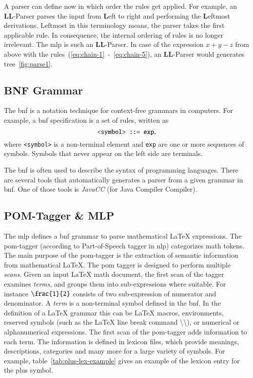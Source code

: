 A parser can define now in which order the rules get applied. For example, an \textbf{LL}-Parser parses the input from \textbf{L}eft to right and performing the \textbf{L}eftmost derivations. Leftmost in this terminology means, the parser takes the first applicable rule. In consequence, the internal ordering of rules is no longer irrelevant. The \gls{mlp} is such an \textbf{LL}-Parser. In case of the expression $x+y-z$ from above with the rules~(\ref{eq:chain-1}~-~\ref{eq:chain-5}), an \textbf{LL}-Parser would generates tree~\ref{fig:parse1}.

\subsection{BNF Grammar}
The \gls{bnf} is a notation technique for context-free grammars in computers. For example, a \gls{bnf} specification is a set of rules, written as
\begin{equation}
\verb|<symbol> ::= exp|,
\end{equation}
where \verb|<symbol>| is a non-terminal element and \verb|exp| are one or more sequences of symbols. Symbols that never appear on the left side are terminals.

The \gls{bnf} is often used to describe the syntax of programming languages. There are several tools that automatically generates a parser from a given grammar in \gls{bnf}. One of those tools is \textit{JavaCC} (for Java Compiler Compiler).

\subsection{POM-Tagger \& MLP}\label{subsec:pom-mlp}
The \gls{mlp} defines a \gls{bnf} grammar to parse mathematical \LaTeX{} expressions. The \gls{pom}-tagger (according to Part-of-Speech tagger in \gls{nlp}) categorizes math tokens. The main purpose of the \gls{pom}-tagger is the extraction of semantic information from mathematical \LaTeX. The \gls{pom} tagger is designed to perform multiple \textit{scans}. Given an input \LaTeX{} math document, the first scan of the tagger examines \textit{terms}, and groups them into sub-expressions where suitable. For instance $\verb|\frac{1}{2}|$ consists of two sub-expression of numerator and denominator. A \textit{term} is a non-terminal symbol defined in the \gls{bnf}. In the definition of a \LaTeX{} grammar this can be \LaTeX{} macros, environments, reserved symbols (such as the \LaTeX{} line break command \textbackslash\textbackslash), or numerical or alphanumerical expressions. The first scan of the \gls{pom}-tagger adds information to each term. The information is defined in lexicon files, which provide meanings, descriptions, categories and many more for a large variety of symbols. For example, table~\ref{tab:plus-lex-example} gives an example of the lexicon entry for the plus symbol.

